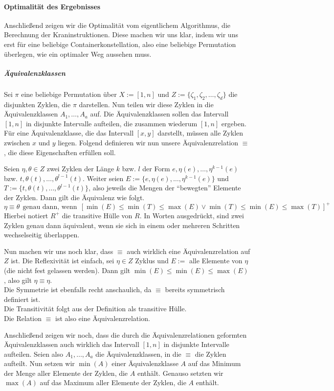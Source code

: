 \paragraph{Optimalität des Ergebnisses}
Anschließend zeigen wir die Optimalität vom eigentlichem Algorithmus, die Berechnung der Kraninstruktionen.
Diese machen wir uns klar, indem wir uns erst für eine beliebige Containerkonstellation, also eine beliebige Permutation überlegen, wie ein optimaler Weg aussehen muss.
\subparagraph{Äquivalenzklassen}
Sei $\pi$ eine beliebige Permutation über $X := [1,n]$ und $Z := \{\zeta_1, \zeta_2, \dots, \zeta_d\}$ die disjunkten Zyklen, die $\pi$ darstellen.
Nun teilen wir diese Zyklen in die Äquivalenzklassen $A_1, \dots, A_a$ auf.
Die Äquivalenzklassen sollen das Intervall $[1,n]$ in disjunkte Intervalle aufteilen, die zusammen wiederum $[1,n]$ ergeben.
Für eine Äquivalenzklasse, die das Intervall $[x,y]$ darstellt, müssen alle Zyklen zwischen $x$ und $y$ liegen.
Folgend definieren wir nun unsere Äquivalenzrelation $\equiv$, die diese Eigenschaften erfüllen soll.

Seien $\eta,\theta \in Z$ zwei Zyklen der Länge $k$ bzw. $l$ der Form $e, \eta(e), \dots, \eta^{k-1}(e)$ bzw. $t, \theta(t), \dots, \theta^{l-1}(t)$.
Weiter seien $E := \{e, \eta(e), \dots, \eta^{k-1}(e)\}$ und $T := \{t, \theta(t), \dots, \theta^{l-1}(t)\}$, also jeweils die Mengen der ``bewegten'' Elemente der Zyklen.
Dann gilt die Äquivalenz wie folgt.
\[ \eta \equiv \theta\ \ \text{genau dann, wenn}\ \ [\min(E) \leq \min(T) \leq \max(E) \vee \min(T) \leq \min(E) \leq \max(T) ]^+ \]
Hierbei notiert $R^+$ die transitive Hülle von $R$.
In Worten ausgedrückt, sind zwei Zyklen genau dann äquivalent, wenn sie sich in einem oder mehreren Schritten wechselseitig überlappen.

Nun machen wir uns noch klar, dass $\equiv$ auch wirklich eine Äquivalenzrelation auf $Z$ ist.
Die Reflexivität ist einfach, sei $\eta \in Z$ Zyklus und $E := $ alle Elemente von $\eta$ (die nicht fest gelassen werden).
Dann gilt $\min(E) \leq \min(E) \leq \max(E)$, also gilt $\eta \equiv \eta$.\\
Die Symmetrie ist ebenfalls recht anschaulich, da $\equiv$ bereits symmetrisch definiert ist.\\
Die Transitivität folgt aus der Definition als transitive Hülle.\\
Die Relation $\equiv$ ist also eine Äquivalenzrelation.

Anschließend zeigen wir noch, dass die durch die Äquivalenzrelationen geformten Äquivalenzklassen auch wirklich das Intervall $[1,n]$ in
 disjunkte Intervalle aufteilen.
Seien also $A_1, \dots, A_a$ die Äquivalenzklassen, in die $\equiv$ die Zyklen aufteilt.
Nun setzen wir $\min(A)$ einer Äquivalenzklasse $A$ auf das Minimum der Menge aller Elemente der Zyklen, die $A$ enthält.
Genauso setzten wir $\max(A)$ auf das Maximum aller Elemente der Zyklen, die $A$ enthält.

